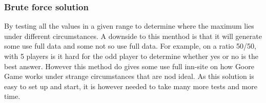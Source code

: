 \subsubsection{Brute force solution}
By testing all the values in a given range to determine where the maximum lies under different
circumstances. A downside to this menthod is that it will generate some use full data and some not so
use full data. For example, on a ratio 50/50, with 5 players is it hard for the  odd player to 
determine whether yes or no is the best answer. However this method do gives some use full inn-site on
how Goore Game works under strange circumstances that are nod ideal. As this solution is easy to set
up and start, it is however needed to take many more tests and more time.


% 
% 
% 
% 
% 
% 
% 
% 
% 
% 
% 
